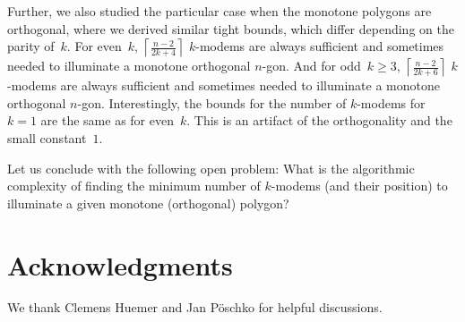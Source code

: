 \documentclass[A4]{article}
\begin{document}
Further, we also studied the particular case when the monotone polygons are orthogonal, where we derived similar tight bounds, which differ depending on the parity of~$k$.
For even~$k$, $\left\lceil \frac{n-2}{2k+4} \right\rceil$ \mbox{$k$-modems} are always sufficient and sometimes needed to illuminate a monotone orthogonal $n$-gon.
And for odd~\mbox{$k\geq3$}, $\left\lceil \frac{n-2}{2k+6} \right\rceil$ \mbox{$k$-modems} are always sufficient and sometimes needed to illuminate a monotone orthogonal $n$-gon.
Interestingly, the bounds for the number of \mbox{$k$-modems} for~$k=1$ are the same as for even~$k$.
This is an artifact of the orthogonality and the small constant~$1$.

Let us conclude with the following open problem: 
What is the algorithmic complexity of finding the minimum number of \mbox{$k$-modems} (and their position)
to illuminate a given monotone (orthogonal) polygon?





\section*{Acknowledgments}
We thank Clemens Huemer and Jan P{\"o}schko for helpful discussions.
\end{document}
